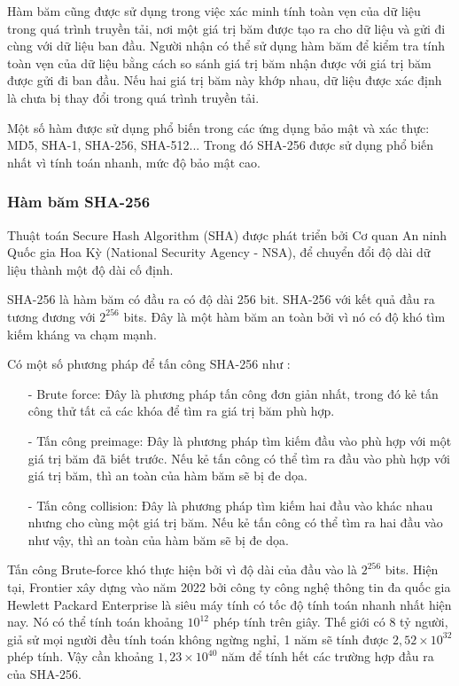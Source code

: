 Hàm băm cũng được sử dụng trong việc xác minh tính toàn vẹn của dữ liệu trong quá trình truyền tải, 
nơi một giá trị băm được tạo ra cho dữ liệu và gửi đi cùng với dữ liệu ban đầu. Người nhận có thể 
sử dụng hàm băm để kiểm tra tính toàn vẹn của dữ liệu bằng cách so sánh giá trị băm nhận được với 
giá trị băm được gửi đi ban đầu. Nếu hai giá trị băm này khớp nhau, dữ liệu được xác định là chưa 
bị thay đổi trong quá trình truyền tải.

Một số hàm được sử dụng phổ biến trong các ứng dụng bảo mật và xác thực: MD5, SHA-1, SHA-256, SHA-512...
Trong đó SHA-256 được sử dụng phổ biến nhất vì tính toán nhanh, mức độ bảo mật cao.
\subsubsection{Hàm băm SHA-256}
Thuật toán Secure Hash Algorithm (SHA) được phát triển bởi Cơ quan An ninh
Quốc gia Hoa Kỳ (National Security Agency - NSA), để chuyển đổi độ dài dữ liệu thành một độ dài cố định.

SHA-256 là hàm băm có đầu ra có độ dài 256 bit. SHA-256 với kết quả đầu ra tương đương với $2^{256}$ bits.
Đây là một hàm băm an toàn bởi vì nó có độ khó tìm kiếm kháng va chạm mạnh. 

Có một số phương pháp để tấn công SHA-256 như :
\begin{itemize}
\item[-] Brute force: Đây là phương pháp tấn công đơn giản nhất, trong đó kẻ tấn công
thử tất cả các khóa để tìm ra giá trị băm phù hợp. 
\item[-] Tấn công preimage: Đây là phương pháp tìm kiếm đầu vào phù hợp với một giá 
trị băm đã biết trước. Nếu kẻ tấn công có thể tìm ra đầu vào phù hợp với giá trị băm, thì an toàn của hàm băm sẽ bị đe dọa.
\item[-] Tấn công collision: Đây là phương pháp tìm kiếm hai đầu vào khác nhau nhưng cho
cùng một giá trị băm. Nếu kẻ tấn công có thể tìm ra hai đầu vào như vậy, thì an toàn của hàm băm sẽ bị đe dọa.
\end{itemize}

Tấn công Brute-force khó thực hiện bởi vì độ dài của đầu vào là $2^{256}$ bits.
Hiện tại, Frontier xây dựng vào năm 2022 bởi công ty công nghệ thông tin đa quốc gia
Hewlett Packard Enterprise là siêu máy tính có tốc độ tính toán nhanh nhất hiện nay. Nó có thể tính
toán khoảng $10^{12}$ phép tính trên giây. Thế giới có 8 tỷ người, giả sử mọi người đều tính toán
không ngừng nghỉ, 1 năm sẽ tính được $2,52 \times 10^{32}$ phép tính. Vậy cần khoảng $1,23 \times 10^{40}$ năm để tính hết các 
trường hợp đầu ra của SHA-256. 


